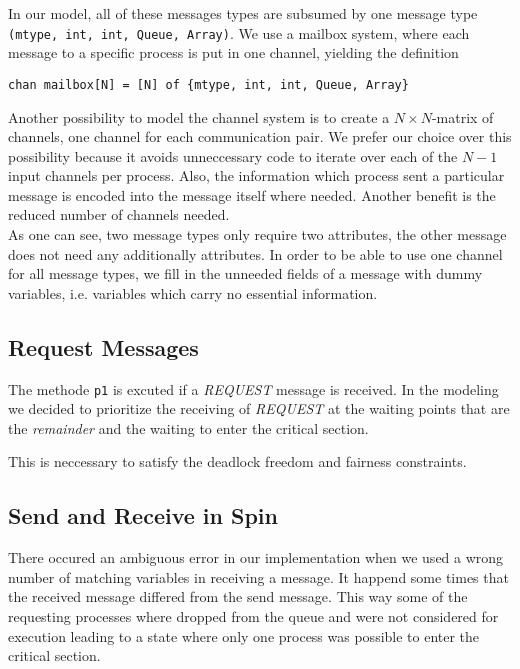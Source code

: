 \documentclass{llncs}
\begin{document}
\noindent In our model, all of these messages types are subsumed by one message
type \lstinline|(mtype, int, int, Queue, Array)|. We use a mailbox system,
where each message to a specific process is put in one channel, yielding the definition

\begin{lstlisting}[morekeywords=chan,frame=single]
chan mailbox[N] = [N] of {mtype, int, int, Queue, Array}
\end{lstlisting}
 
Another possibility to model the channel system is to create a $N\times N$-matrix of channels,
one channel for each communication pair. We prefer our choice over this possibility because it
avoids unneccessary code to iterate over each of the $N-1$ input channels per process.
Also, the information which process sent a particular message is encoded into the message itself where needed.
Another benefit is the reduced number of channels needed. \\

As one can see, two message types only require two attributes, the other message does not need any
additionally attributes. In order to be able to use one channel for all message types, we
fill in the unneeded fields of a message with dummy variables, i.e. variables which carry
no essential information.

\subsection{Request Messages}

The methode \lstinline|p1| is excuted if a \emph{REQUEST} message is received.
In the modeling we decided to prioritize the receiving of \emph{REQUEST} at the
waiting points that are the \emph{remainder} and the waiting to enter the critical section.

This is neccessary to satisfy the deadlock freedom and fairness constraints.


\subsection{Send and Receive in Spin}

There occured an ambiguous error in our implementation when we used a wrong number of matching
variables in receiving a message. It happend some times that the received message differed from the
send message. This way some of the requesting processes where dropped from the queue and were not considered
for execution leading to a state where only one process was possible to enter the critical section.
\end{document}
